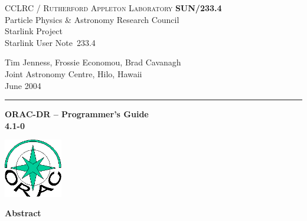 \documentclass[twoside,11pt]{article}
\newcommand{\stardoccategory}  {Starlink User Note}
\newcommand{\stardocinitials}  {SUN}
\newcommand{\stardocnumber}    {233.4}
\newcommand{\stardocauthors}   {Tim Jenness, Frossie Economou, Brad Cavanagh\\
Joint Astronomy Centre, Hilo, Hawaii}
\newcommand{\stardocdate}      {June 2004}
\newcommand{\stardoctitle}     {ORAC-DR -- Programmer's Guide}
\newcommand{\stardocversion}   {4.1-0}
\newcommand{\stardocmanual}    {}
\newcommand{\stardocname}{\stardocinitials /\stardocnumber}
\newenvironment{latexonly}{}{}
\renewcommand{\_}{\texttt{\symbol{95}}}
\begin{document}
\thispagestyle{empty}

\begin{latexonly}
   CCLRC / \textsc{Rutherford Appleton Laboratory} \hfill \textbf{\stardocname}\\
   {\large Particle Physics \& Astronomy Research Council}\\
   {\large Starlink Project\\}
   {\large \stardoccategory\ \stardocnumber}
   \begin{flushright}
   \stardocauthors\\
   \stardocdate
   \end{flushright}
   \vspace{-4mm}
   \rule{\textwidth}{0.5mm}
   \vspace{5mm}
   \begin{center}
   {\Huge\textbf{\stardoctitle \\ [2.5ex]}}
   {\LARGE\textbf{\stardocversion \\ [4ex]}}
   {\Huge\textbf{\stardocmanual}}
   \end{center}
   \vspace{5mm}

\begin{center}
\includegraphics[width=1.0in]{sun233_logo}
\end{center}

   \vspace{10mm}
   \begin{center}
      {\Large\textbf{Abstract}}
   \end{center}
\end{latexonly}
\end{document}
